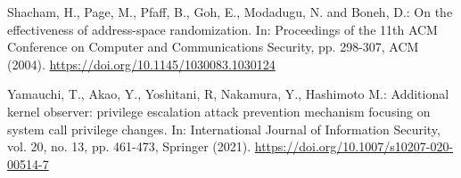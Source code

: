 \documentclass[english,sigrecommended,JIP]{ipsj}
\begin{document}
\begin{thebibliography}{99}
  Shacham, H., Page, M., Pfaff, B., Goh, E., Modadugu, N. and Boneh, D.: On the effectiveness of address-space randomization. In: Proceedings of the 11th ACM Conference on Computer and Communications Security, pp. 298-307, ACM (2004). \url{https://doi.org/10.1145/1030083.1030124}

  Yamauchi, T., Akao, Y., Yoshitani, R, Nakamura, Y., Hashimoto M.: Additional kernel observer: privilege escalation attack prevention mechanism focusing on system call privilege changes. In: International Journal of Information Security, vol. 20, no. 13, pp. 461-473, Springer (2021). \url{https://doi.org/10.1007/s10207-020-00514-7}


\end{thebibliography}
\end{document}
